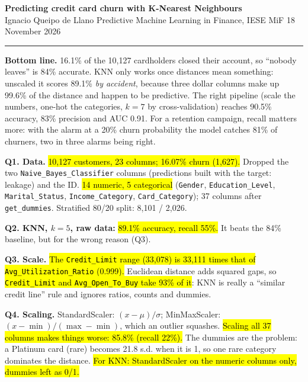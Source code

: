 \documentclass[10pt,a4paper]{article}
\newcommand{\q}[1]{\textbf{\color{blue!50!black}#1}}
\begin{document}
\small

{\large\textbf{Predicting credit card churn with K-Nearest Neighbours}}\\
Ignacio Queipo de Llano \textperiodcentered{} Predictive Machine Learning in Finance, IESE MiF \textperiodcentered{} 18 November 2026\\[-6pt]
\rule{\linewidth}{0.4pt}

\begin{tcolorbox}[colback=white,colframe=black,boxrule=0.4pt,sharp corners,left=5pt,right=5pt,top=3pt,bottom=3pt]
\textbf{Bottom line.} 16.1\% of the 10,127 cardholders closed their account, so ``nobody leaves'' is 84\% accurate.
KNN only works once distances mean something: unscaled it scores 89.1\% \emph{by accident}, because three dollar columns
make up 99.6\% of the distance and happen to be predictive. The right pipeline (scale the numbers, one-hot the
categories, $k=7$ by cross-validation) reaches 90.5\% accuracy, 83\% precision and AUC 0.91. For a retention campaign,
recall matters more: with the alarm at a 20\% churn probability the model catches 81\% of churners, two in three alarms
being right.
\end{tcolorbox}

\q{Q1. Data.} \hl{10,127 customers, 23 columns; 16.07\% churn (1,627).} Dropped the two
\texttt{Naive\_Bayes\_Classifier} columns (predictions built with the target: leakage) and the ID. \hl{14 numeric, 5
categorical} (\texttt{Gender}, \texttt{Education\_Level}, \texttt{Marital\_Status}, \texttt{Income\_Category},
\texttt{Card\_Category}); 37 columns after \texttt{get\_dummies}. Stratified 80/20 split: 8,101 / 2,026.

\q{Q2. KNN, $k=5$, raw data:} \hl{89.1\% accuracy, recall 55\%.} It beats the 84\% baseline, but for the wrong reason (Q3).

\q{Q3. Scale.} \hl{The \texttt{Credit\_Limit} range (33,078) is 33,111 times that of \texttt{Avg\_Utilization\_Ratio}
(0.999).} Euclidean distance adds squared gaps, so \hl{\texttt{Credit\_Limit} and \texttt{Avg\_Open\_To\_Buy} take 93\%
of it}: KNN is really a ``similar credit line'' rule and ignores ratios, counts and dummies.

\q{Q4. Scaling.} StandardScaler: $(x-\mu)/\sigma$; MinMaxScaler: $(x-\min)/(\max-\min)$, which an outlier squashes.
\hl{Scaling all 37 columns makes things worse: 85.8\% (recall 22\%).} The dummies are the problem: a Platinum card
(rare) becomes 21.8 s.d. when it is 1, so one rare category dominates the distance. \hl{For KNN: StandardScaler on the
numeric columns only, dummies left as 0/1.}
\end{document}
